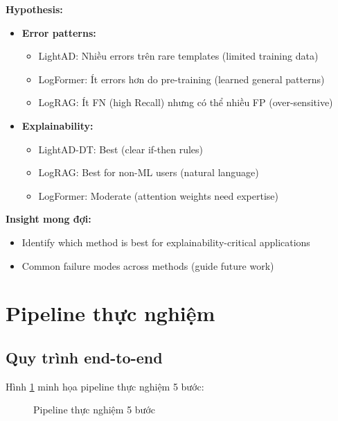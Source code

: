 \textbf{Hypothesis:}
\begin{itemize}
    \item \textbf{Error patterns:} 
        \begin{itemize}
            \item LightAD: Nhiều errors trên rare templates (limited training data)
            \item LogFormer: Ít errors hơn do pre-training (learned general patterns)
            \item LogRAG: Ít FN (high Recall) nhưng có thể nhiều FP (over-sensitive)
        \end{itemize}
    \item \textbf{Explainability:}
        \begin{itemize}
            \item LightAD-DT: Best (clear if-then rules)
            \item LogRAG: Best for non-ML users (natural language)
            \item LogFormer: Moderate (attention weights need expertise)
        \end{itemize}
\end{itemize}

\textbf{Insight mong đợi:} 
\begin{itemize}
    \item Identify which method is best for explainability-critical applications
    \item Common failure modes across methods (guide future work)
\end{itemize}

\section{Pipeline thực nghiệm}
\label{sec:experimental-pipeline}

\subsection{Quy trình end-to-end}
\label{subsec:pipeline-overview}

Hình \ref{fig:pipeline} minh họa pipeline thực nghiệm 5 bước:

\begin{figure}[ht]
\centering
{}
\caption{Pipeline thực nghiệm 5 bước}
\label{fig:pipeline}
\end{figure}

